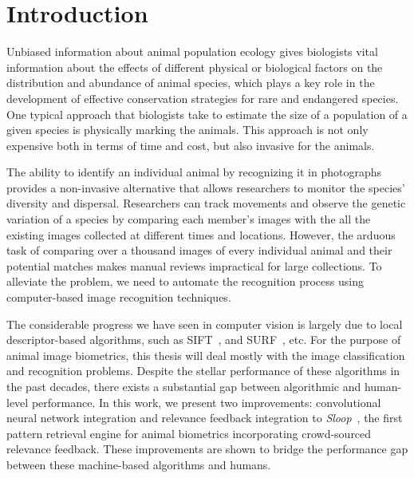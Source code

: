
\chapter{Introduction}

Unbiased information about animal population ecology gives biologists vital
information about the effects of different physical or biological factors on
the distribution and abundance of animal species, which plays a key role in the
development of effective conservation strategies for rare and endangered
species. One typical approach that biologists take to estimate the size of a
population of a given species is physically marking the animals.  This approach
is not only expensive both in terms of time and cost, but also invasive for the
animals.

The ability to identify an individual animal by recognizing it in photographs
provides a non-invasive alternative that allows researchers to monitor the
species' diversity and dispersal.  Researchers can track movements and observe
the genetic variation of a species by comparing each member's images with the
all the existing images collected at different times and locations. However,
the arduous task of comparing over a thousand images of every individual animal
and their potential matches makes manual reviews impractical for large
collections. To alleviate the problem, we need to automate the recognition
process using computer-based image recognition techniques.

The considerable progress we have seen in computer vision is largely due to
local descriptor-based algorithms, such as SIFT~\cite{lowe04}, and
SURF~\cite{surf08}, etc.  For the purpose of animal image biometrics, this
thesis will deal mostly with the image classification and recognition problems.
Despite the stellar performance of these algorithms in the past decades, there
exists a substantial gap between algorithmic and human-level performance. In
this work, we present two improvements: convolutional neural network
integration and relevance feedback integration to \emph{Sloop}~\cite{sloop},
the first pattern retrieval engine for animal biometrics incorporating
crowd-sourced relevance feedback.  These improvements are shown to bridge the
performance gap between these machine-based algorithms and humans.

